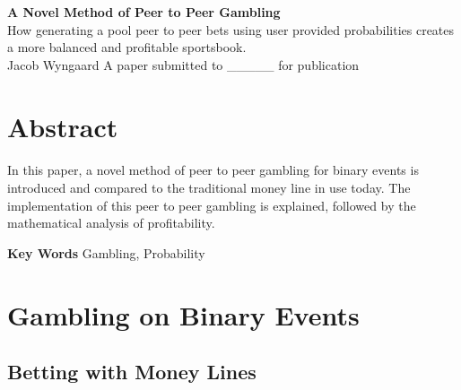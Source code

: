 \documentclass[12pt,letterpaper]{article}
\begin{document}
\begin{titlepage}
	\begin{center}

	\vspace*{1 cm}
	\textbf{\Large A Novel Method of Peer to Peer Gambling} \\
	\vspace*{1 cm}
	How generating a pool peer to peer bets using user provided probabilities creates a more balanced and profitable sportsbook. \\
	\vspace*{1 cm}
	Jacob Wyngaard
	\vfill
	A paper submitted to _____ for publication

	\end{center}
\end{titlepage}

\section*{Abstract}

\paragraph{} In this paper, a novel method of peer to peer gambling for binary events is introduced and compared to the traditional money line in use today. The implementation of this peer to peer gambling is explained, followed by the mathematical analysis of profitability. \\

\vspace*{1 cm}

 \textbf{\Large Key Words} \hspace{.5cm} Gambling, Probability

\pagebreak


\section{Gambling on Binary Events}

\subsection{Betting with Money Lines}
\end{document}
